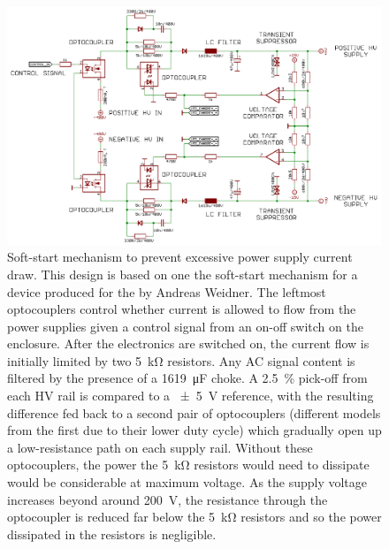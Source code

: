 \begin{figure}
  \centering
  \includegraphics[width=\columnwidth]{graphics/60-hv-amp-soft-start.pdf}
  \caption[High voltage amplifier soft-start schematic]{\label{fig:hv-amp-soft-start}Soft-start mechanism to prevent excessive power supply current draw. This design is based on one the soft-start mechanism for a device produced for the \AEIPROTOTYPE{} by Andreas Weidner. The leftmost optocouplers control whether current is allowed to flow from the power supplies given a control signal from an on-off switch on the enclosure. After the electronics are switched on, the current flow is initially limited by two \SI{5}{\kilo\ohm} resistors. Any \gls{AC} signal content is filtered by the presence of a \SI{1619}{\micro\farad} choke. A \SI{2.5}{\percent} pick-off from each \gls{HV} rail is compared to a \SI{\pm5}{\volt} reference, with the resulting difference fed back to a second pair of optocouplers (different models from the first due to their lower duty cycle) which gradually open up a low-resistance path on each supply rail. Without these optocouplers, the power the \SI{5}{\kilo\ohm} resistors would need to dissipate would be considerable at maximum voltage. As the supply voltage increases beyond around \SI{200}{\volt}, the resistance through the optocoupler is reduced far below the \SI{5}{\kilo\ohm} resistors and so the power dissipated in the resistors is negligible.}
\end{figure}


